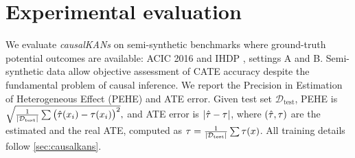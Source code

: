 \section{Experimental evaluation}
\label{sec:experiments}
We evaluate \emph{causalKANs} on semi-synthetic benchmarks where ground-truth potential outcomes are available: ACIC 2016 \citep{Dorie2017} and IHDP \citep{hill11bayesian}, settings A and B. Semi-synthetic data allow objective assessment of CATE accuracy despite the fundamental problem of causal inference. We report \itemi the Precision in Estimation of Heterogeneous Effect (PEHE) and \itemii ATE error. Given test set $\mathcal{D}_{\text{test}}$, PEHE is $
\sqrt{
\frac{1}{|\mathcal{D}_{\text{test}}|}\sum
\big(\hat{\tau}(x_i)-\tau(x_i)\big)^2},
$
and ATE error is $|\hat{\tau}-\tau|$, where $(\hat{\tau}, {\tau})$ are the estimated and the real ATE, computed as $\tau=\frac{1}{|\mathcal{D}_{\text{test}}|}\sum \tau(x)$. All training details follow \cref{sec:causalkans}.

